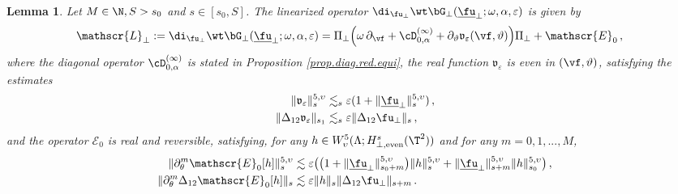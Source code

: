 \documentclass[a4paper,reqno,10pt]{article}
\newtheorem{lem}{Lemma}[section]
\newcommand{\pa}{\partial}
\newcommand{\sL}{\mathscr{L}}
\newcommand{\sE}{\mathscr{E}}
\newcommand{\fv}{\mathfrak{v}}
\begin{document}


\begin{lem}\label{expand.sL.pert}
	Let $M\in\N, S>s_0$ and $s\in[s_0,S]$. The linearized operator $\di_{\fu_{\perp}}\wt\bG_{\perp}(\underline{\fu}_\perp;\omega,\alpha,\varepsilon)$ is given by
	\begin{align}
		\sL_{\perp} &:= \di_{\fu_{\perp}}\wt\bG_{\perp}(\underline{\fu}_\perp;\omega,\alpha,\varepsilon) 
		= \Pi_{\perp} \Big(  \omega\,\pa_{\vf}  + \cD_{0,\alpha}^{(\infty)}+ \pa_{\vartheta} \fv_{\varepsilon}(\vf,\vartheta) \Big) \Pi_{\perp} +\sE_{0}\,,\label{sL.perp}
	\end{align} 
	where the diagonal operator $\cD_{0,\alpha}^{(\infty)}$ is stated  in Proposition \ref{prop.diag.red.equi}, the real function $\fv_{\varepsilon}$ is even in $(\vf,\vartheta)$, satisfying the estimates 
	\begin{align}
		\| {\mathfrak v}_{\varepsilon} \|_{s}^{5,\upsilon} & \lesssim_{s} \varepsilon (1+ \|\underline{\fu}_{\perp} \|_s^{5,\upsilon}) \,,\label{fv.est} \\
		\| \Delta_{12}{\mathfrak v}_{\varepsilon} \|_{s_1} &\lesssim_{s} \varepsilon \| \Delta_{12}\fu_{\perp} \|_{s} \,, \label{fv.est12}
	\end{align}
	and the  operator $\sE_{0}$ is real and reversible, satisfying,   for any $h \in W_\upsilon^5(\Lambda;H^s_{\perp,\textnormal{even}}(\T^2))$ and for any $m=0,1,...,M$,
	\begin{align}
		\| \partial_\theta^{m}\sE_{0}[h] \|_{s}^{5,\upsilon} & \lesssim \varepsilon\big(\big(1+\| \underline{\fu}_{\perp}\|_{s_0+m}^{5,\upsilon}\big) \| h \|_{s}^{5,\upsilon} + \|\underline{\fu}_{\perp} \|_{s+m}^{5,\upsilon} \| h \|_{s_0}^{5,\upsilon} \big)\,,  \label{sE.smooth.est} \\
		\|\partial_\theta^{m} \Delta_{12}\sE_{0}[h] \|_{s}& \lesssim \varepsilon  \| h \|_{s}  \| \Delta_{12}\fu_{\perp} \|_{s+m}  \,.\label{sE.smooth.est12}
	\end{align}
\end{lem}
\end{document}

